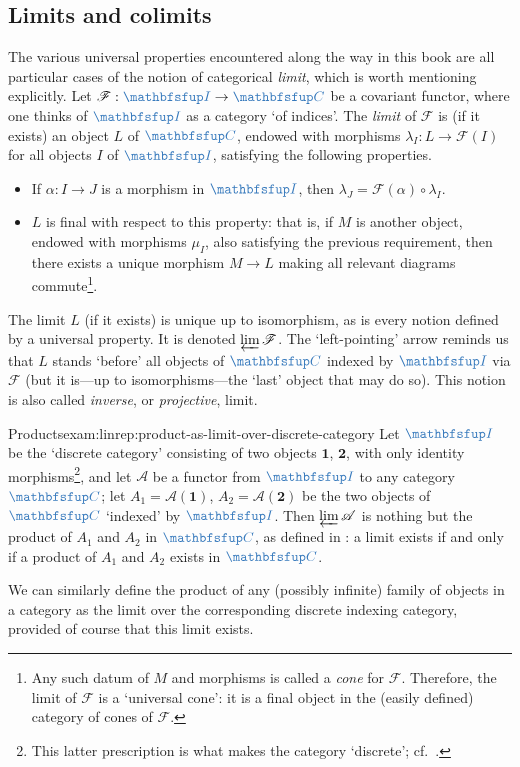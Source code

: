 \subsection{Limits and colimits}
\label{subsec:linrep:limits-and-colimits}
The various universal properties encountered along the way in this
book are all particular cases of the notion of categorical
\emph{limit}, which is worth mentioning explicitly. Let
$\mathscr{F} : \categ{I} \to \categ{C}$ be a covariant functor, where
one thinks of $\categ{I}$ as a category `of indices'. The \emph{limit}
of $\mathscr{F}$ is (if it exists) an object $L$ of $\categ{C}$,
endowed with morphisms $\lambda_I : L \to \mathscr{F}(I)$ for all
objects $I$ of $\categ{I}$, satisfying the following properties.
\begin{itemize}
\item If $\alpha : I \to J$ is a morphism in $\categ{I}$, then
  $\lambda_J = \mathscr{F}(\alpha) \circ \lambda_I$.
\item $L$ is final with respect to this property: that is, if $M$ is
  another object, endowed with morphisms $\mu_I$, also satisfying the
  previous requirement, then there exists a unique morphism $M \to L$
  making all relevant diagrams commute\footnote{Any such datum of $M$
    and morphisms is called a \emph{cone} for
    $\mathscr{F}$. Therefore, the limit of $\mathscr{F}$ is a
    `universal cone': it is a final object in the (easily defined)
    category of cones of $\mathscr{F}$.}.
\end{itemize}
The limit $L$ (if it exists) is unique up to isomorphism, as is every
notion defined by a universal property. It is denoted
$\varprojlim \mathscr{F}$. The `left-pointing' arrow reminds us that
$L$ stands `before' all objects of $\categ{C}$ indexed by $\categ{I}$
via $\mathscr{F}$ (but it is---up to isomorphisms---the `last' object
that may do so). This notion is also called \emph{inverse}, or
\emph{projective}, limit.
\begin{exam}{Products}{exam:linrep:product-as-limit-over-discrete-category}
  Let $\categ{I}$ be the `discrete category' consisting of two objects
  $\mathbf{1}$, $\mathbf{2}$, with only identity
  morphisms\footnote{This latter prescription is what makes the
    category `discrete'; cf.\ .}, and
  let $\mathscr{A}$ be a functor from $\categ{I}$ to any category
  $\categ{C}$; let $A_1 = \mathscr{A}(\mathbf{1})$,
  $A_2 = \mathscr{A}(\mathbf{2})$ be the two objects of $\categ{C}$
  `indexed' by $\categ{I}$. Then $\varprojlim \mathscr{A}$ is nothing
  but the product of $A_1$ and $A_2$ in $\categ{C}$, as defined in
  : a limit exists if and only if a
  product of $A_1$ and $A_2$ exists in $\categ{C}$.

  We can similarly define the product of any (possibly infinite)
  family of objects in a category as the limit over the corresponding
  discrete indexing category, provided of course that this limit
  exists.
\end{exam}
